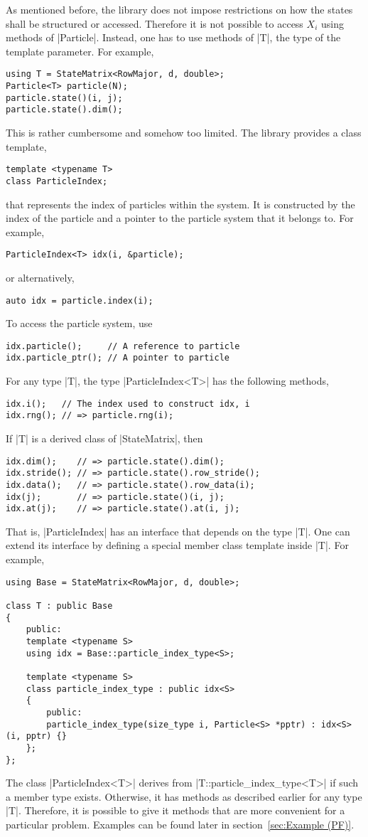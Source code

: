 As mentioned before, the library does not impose restrictions on how the states
shall be structured or accessed. Therefore it is not possible to access $X_i$
using methods of |Particle|. Instead, one has to use methods of |T|, the type
of the template parameter. For example,
\begin{verbatim}
using T = StateMatrix<RowMajor, d, double>;
Particle<T> particle(N);
particle.state()(i, j);
particle.state().dim();
\end{verbatim}
This is rather cumbersome and somehow too limited. The library provides a class
template,
\begin{verbatim}
template <typename T>
class ParticleIndex;
\end{verbatim}
that represents the index of particles within the system. It is constructed by
the index of the particle and a pointer to the particle system that it belongs
to. For example,
\begin{verbatim}
ParticleIndex<T> idx(i, &particle);
\end{verbatim}
or alternatively,
\begin{verbatim}
auto idx = particle.index(i);
\end{verbatim}
To access the particle system, use
\begin{verbatim}
idx.particle();     // A reference to particle
idx.particle_ptr(); // A pointer to particle
\end{verbatim}
For any type |T|, the type |ParticleIndex<T>| has the following methods,
\begin{verbatim}
idx.i();   // The index used to construct idx, i
idx.rng(); // => particle.rng(i);
\end{verbatim}
If |T| is a derived class of |StateMatrix|, then
\begin{verbatim}
idx.dim();    // => particle.state().dim();
idx.stride(); // => particle.state().row_stride();
idx.data();   // => particle.state().row_data(i);
idx(j);       // => particle.state()(i, j);
idx.at(j);    // => particle.state().at(i, j);
\end{verbatim}
That is, |ParticleIndex| has an interface that depends on the type |T|. One can
extend its interface by defining a special member class template inside |T|.
For example,
\begin{verbatim}
using Base = StateMatrix<RowMajor, d, double>;

class T : public Base
{
    public:
    template <typename S>
    using idx = Base::particle_index_type<S>;

    template <typename S>
    class particle_index_type : public idx<S>
    {
        public:
        particle_index_type(size_type i, Particle<S> *pptr) : idx<S>(i, pptr) {}
    };
};
\end{verbatim}
The class |ParticleIndex<T>| derives from |T::particle_index_type<T>| if such a
member type exists. Otherwise, it has methods as described earlier for any type
|T|. Therefore, it is possible to give it methods that are more convenient for
a particular problem. Examples can be found later in section~\ref{sec:Example
(PF)}.

